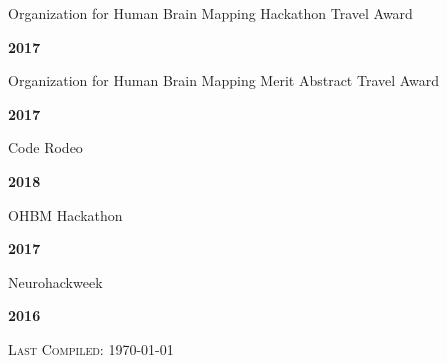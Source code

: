 \documentclass[10pt]{article}
\newenvironment{bottompar}{\par\vspace*{\fill}}{\clearpage}
\newcommand{\headstyle}{\scshape \normalsize \textcolor{light-gray}}
\newcommand{\sectionstyle}{\LARGE \fontfamily{lmr}\selectfont}
\begin{document}
\bigskip

\begin{center}\sectionstyle{HONORS AND AWARDS}\end{center}

\begin{minipage}[t]{.85\linewidth}
\flushleft
\noindent
Organization for Human Brain Mapping Hackathon Travel Award
\end{minipage}
\hfill
\begin{minipage}[t]{.15\linewidth}
\flushright
\noindent
\textsc{\textbf{2017}}
\end{minipage}

\begin{minipage}[t]{.85\linewidth}
\flushleft
\noindent
Organization for Human Brain Mapping Merit Abstract Travel Award
\end{minipage}
\hfill
\begin{minipage}[t]{.15\linewidth}
\flushright
\noindent
\textsc{\textbf{2017}}
\end{minipage}

\bigskip

\begin{center}\sectionstyle{HACKATHONS}\end{center}

\begin{minipage}[t]{.85\linewidth}
\flushleft
\noindent
Code Rodeo
\end{minipage}
\hfill
\begin{minipage}[t]{.15\linewidth}
\flushright
\noindent
\textsc{\textbf{2018}}
\end{minipage}

\begin{minipage}[t]{.85\linewidth}
\flushleft
\noindent
OHBM Hackathon
\end{minipage}
\hfill
\begin{minipage}[t]{.15\linewidth}
\flushright
\noindent
\textsc{\textbf{2017}}
\end{minipage}

\begin{minipage}[t]{.85\linewidth}
\flushleft
\noindent
Neurohackweek
\end{minipage}
\hfill
\begin{minipage}[t]{.15\linewidth}
\flushright
\noindent
\textsc{\textbf{2016}}
\end{minipage}

\begin{bottompar}
	\begin{center}
		\headstyle{Last Compiled: \today}
	\end{center}
\end{bottompar}
\end{document}
